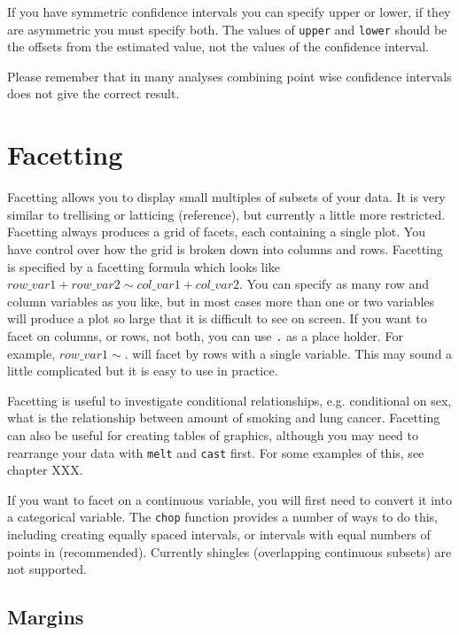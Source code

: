 If you have symmetric confidence intervals you can specify upper or lower, if they are asymmetric you must specify both.  The values of {\tt upper} and {\tt lower} should be the offsets from the estimated value, not the values of the confidence interval.

Please remember that in many analyses combining point wise confidence intervals does not give the correct result.

\section{Facetting}\label{sec:facetting}

Facetting allows you to display small multiples of subsets of your data.  It is very similar to trellising or latticing (reference), but currently a little more restricted.  Facetting always produces a grid of facets, each containing a single plot.  You have control over how the grid is broken down into columns and rows.  Facetting is specified by a facetting formula which looks like $row\_var1 + row\_var2 \sim col\_var1 + col\_var2$.  You can specify as many row and column variables as you like, but in most cases more than one or two variables will produce a plot so large that it is difficult to see on screen.  If you want to facet on columns, or rows, not both, you can use {\tt .} as a place holder.  For example, $row\_var1 \sim .$ will facet by rows with a single variable.  This may sound a little complicated but it is easy to use in practice.

Facetting is useful to investigate conditional relationships, e.g. conditional on sex, what is the relationship between amount of smoking and lung cancer.  Facetting can also be useful for creating tables of graphics, although you may need to rearrange your data with {\tt melt} and {\tt cast} first.  For some examples of this, see chapter XXX.

If you want to facet on a continuous variable, you will first need to convert it into a categorical variable.  The {\tt chop} function provides a number of ways to do this, including creating equally spaced intervals, or intervals with equal numbers of points in (recommended).  Currently shingles (overlapping continuous subsets) are not supported.  

\subsection{Margins}\label{sub:margins}

